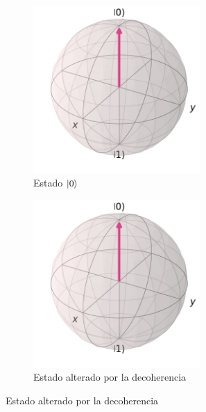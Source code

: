 \documentclass[12pt]{article}
\numberwithin{equation}{section} %
\begin{document}
    \vspace{2.5mm}

    \begin{figure}[!h]
        \centering
        \begin{subfigure}[t]{0.45\textwidth}
            \centering
            \includegraphics[width=0.70\textwidth]{./img/Bloch/bloch_state_0.png}
            \caption{Estado \( \ket{0} \)}\label{fig: estado_0}
        \end{subfigure}
        \hfill
        \begin{subfigure}[t]{0.45\textwidth}
            \centering
            \includegraphics[width=0.70\textwidth]{./img/Bloch/bloch_state_0.png}
            \caption{Estado alterado por la decoherencia}\label{fig: estado_alterado_decoherencia}
        \end{subfigure}
    \end{figure}
\end{document}
